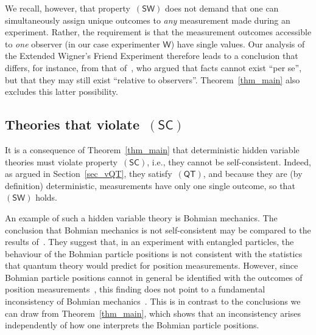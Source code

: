 \documentclass[12pt]{article}
\theoremstyle{plain}
\theoremstyle{definition}
\newcommand*{\Friendone}{\mathsf{F1}}
\newcommand*{\Wigner}{\mathsf{W}}
\newcommand*{\splus}{{\textstyle + \frac{1}{2}}}
\newcommand*{\QT}{\mathsf{(QT)}}
\newcommand*{\SW}{\mathsf{(SW)}}
\newcommand*{\SelfCons}{\mathsf{(SC)}}
\newcommand*{\ok}{\mathsf{ok}}
\newcommand*{\head}{\mathsf{head}}
\newcommand*{\tail}{\mathsf{tail}}
\begin{document}
We recall, however, that property~$\SW$ does not demand that one can simultaneously assign unique outcomes to \emph{any} measurement made during an experiment. Rather, the requirement is  that  the measurement outcomes accessible to \emph{one} observer (in our case experimenter $\Wigner$) have single values.  Our analysis of the Extended Wigner's Friend Experiment therefore leads to a conclusion that differs, for instance, from that of~\cite{Brukner15}, who argued that facts cannot exist ``per se'', but that they may still exist ``relative to observers''.  Theorem~\ref{thm_main} also excludes this latter possibility. 


\subsection{Theories that violate~$\SelfCons$}

It is a consequence of Theorem~\ref{thm_main} that deterministic hidden variable theories must violate property~$\SelfCons$, i.e., they cannot be self-consistent. Indeed, as argued in Section~\ref{sec_vQT}, they satisfy~$\QT$, and because they are (by definition) deterministic, measurements have only one single outcome, so that~$\SW$ holds. 

An example of such a hidden variable theory is Bohmian mechanics. The conclusion that Bohmian mechanics is not self-consistent may be compared to the results of~\cite{CorMor02,KiuWer10}. They suggest that, in an experiment with entangled particles, the behaviour of the Bohmian particle positions  is not consistent with the statistics that quantum theory would predict for position measurements.  However, since Bohmian particle positions cannot in general be identified with the outcomes of position measurements~\cite{ESSW92,Vaidman05}, this finding does not point to a fundamental inconsistency of Bohmian mechanics~\cite{Gisin15}. This is in  contrast to the conclusions we can draw from Theorem~\ref{thm_main}, which shows that an inconsistency arises independently of how one interprets the Bohmian particle positions.

\end{document}
